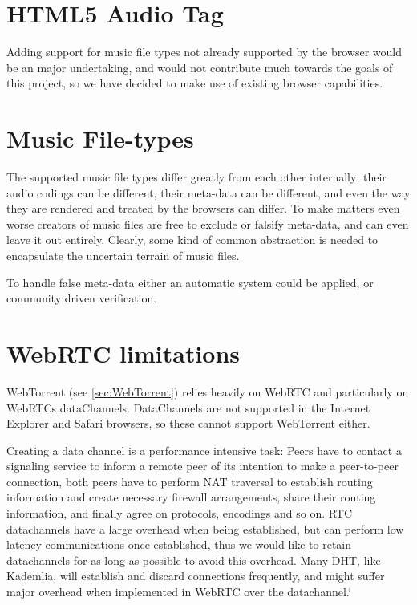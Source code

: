 \section{HTML5 Audio Tag}
Adding support for music file types not already supported by the browser 
would be an major undertaking, 
and would not contribute much towards the goals of this project, 
so we have decided to make use of existing browser capabilities.

\section{Music File-types}
The supported music file types differ greatly from each other internally; 
their audio codings can be different, their meta-data can be different,
and even the way they are rendered and treated by the browsers can differ.
To make matters even worse creators of music files are free to exclude or falsify meta-data, 
and can even leave it out entirely.
Clearly, some kind of common abstraction is needed to encapsulate the uncertain terrain of music files.

To handle false meta-data either an automatic system could be applied, or
community driven verification.

\section{WebRTC limitations}
WebTorrent (see \ref{sec:WebTorrent}) relies heavily on WebRTC and particularly on WebRTCs dataChannels.
DataChannels are not supported in the Internet Explorer and Safari browsers, 
so these cannot support WebTorrent either.

Creating a data channel is a performance intensive task:
Peers have to contact a signaling service to inform a remote peer of its intention
to make a peer-to-peer connection, both peers have to perform NAT traversal to establish routing information 
and create necessary firewall arrangements, share their routing information,
and finally agree on protocols, encodings and so on.
RTC datachannels have a large overhead when being established,
but can perform low latency communications once established, 
thus we would like to retain datachannels for as long as possible to avoid this overhead.
Many \acs{DHT}, like Kademlia, will establish and discard connections frequently,
and might suffer major overhead when implemented in WebRTC over the datachannel.`

